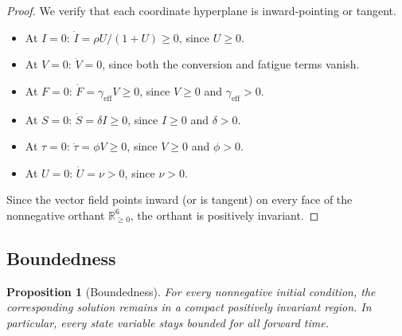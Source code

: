 \documentclass[11pt]{article}
\newtheorem{proposition}{Proposition}
\begin{document}
\begin{proof}
We verify that each coordinate hyperplane is inward-pointing or tangent.
\begin{itemize}[leftmargin=1.5em]
    \item At $I = 0$: $\dot{I} = \rho U/(1+U) \geq 0$, since $U \geq 0$.
    \item At $V = 0$: $\dot{V} = 0$, since both the conversion and fatigue terms vanish.
    \item At $F = 0$: $\dot{F} = \gamma_{\mathrm{eff}} V \geq 0$, since $V \geq 0$ and $\gamma_{\mathrm{eff}} > 0$.
    \item At $S = 0$: $\dot{S} = \delta I \geq 0$, since $I \geq 0$ and $\delta > 0$.
    \item At $\tau = 0$: $\dot{\tau} = \phi V \geq 0$, since $V \geq 0$ and $\phi > 0$.
    \item At $U = 0$: $\dot{U} = \nu > 0$, since $\nu > 0$.
\end{itemize}
Since the vector field points inward (or is tangent) on every face of the nonnegative orthant $\mathbb{R}^6_{\geq 0}$, the orthant is positively invariant.
\end{proof}

\subsection{Boundedness}

\begin{proposition}[Boundedness]
\label{prop:bounded}
For every nonnegative initial condition, the corresponding solution remains in a compact positively invariant region. In particular, every state variable stays bounded for all forward time.
\end{proposition}
\end{document}
